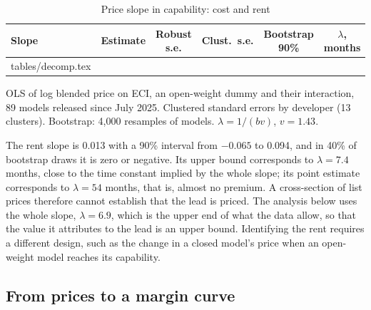 \documentclass[12pt]{article}
\makeatletter
\newcommand{\tabinput}[1]{\@@input #1 }
\makeatother
\begin{document}
\begin{table}[t]
\centering
\begin{threeparttable}
\caption{Price slope in capability: cost and rent}
\label{tab:decomp}
\small
\begin{tabular}{lccccc}
\toprule
Slope & Estimate & Robust s.e. & Clust.\ s.e. & Bootstrap 90\% & $\lambda$, months \\
\midrule
\tabinput{tables/decomp.tex}
\bottomrule
\end{tabular}
\begin{tablenotes}\footnotesize
\item OLS of log blended price on ECI, an open-weight dummy and their interaction, 89 models released since July 2025. Clustered standard errors by developer (13 clusters). Bootstrap: 4,000 resamples of models. $\lambda = 1/(b v)$, $v = 1.43$.
\end{tablenotes}
\end{threeparttable}
\end{table}

The rent slope is 0.013 with a 90\% interval from $-0.065$ to 0.094, and in 40\% of bootstrap draws it is zero or negative. Its upper bound corresponds to $\lambda = 7.4$ months, close to the time constant implied by the whole slope; its point estimate corresponds to $\lambda = 54$ months, that is, almost no premium. A cross-section of list prices therefore cannot establish that the lead is priced. The analysis below uses the whole slope, $\lambda = 6.9$, which is the upper end of what the data allow, so that the value it attributes to the lead is an upper bound. Identifying the rent requires a different design, such as the change in a closed model's price when an open-weight model reaches its capability.

\subsection{From prices to a margin curve}
\end{document}
